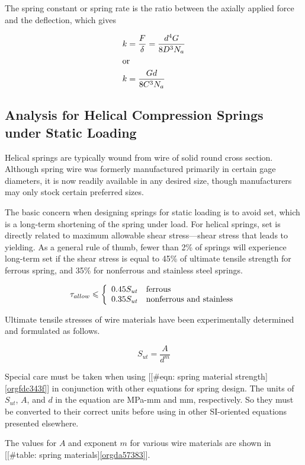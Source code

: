 \documentclass[a4paper,openany,12pt]{book}
\begin{document}
{{The spring constant or spring rate is the ratio between the axially
applied force and the deflection, which gives

\begin{gather}
\label{eq:orgcc2af92}
  k = \frac{F}{\delta} = \frac{d^4G}{8D^3N_a} \hfill \\
  \text{or} \hfill \\
  k = \frac{Gd}{8C^3N_a} \hfill \\ 
\end{gather}

\subsection{Analysis for Helical Compression Springs under Static Loading}
\label{sec:orga96fcd2}
Helical springs are typically wound from wire of solid round cross
section. Although spring wire was formerly manufactured primarily in
certain gage diameters, it is now readily available in any desired size,
though manufacturers may only stock certain preferred sizes.

The basic concern when designing springs for static loading is to avoid
set, which is a long-term shortening of the spring under load. For
helical springs, set is directly related to maximum allowable shear
stress---shear stress that leads to yielding. As a general rule of
thumb, fewer than 2\% of springs will experience long-term set if the
shear stress is equal to 45\% of ultimate tensile strength for ferrous
spring, and 35\% for nonferrous and stainless steel springs.

$$\tau_{allow} \leqslant \left\{
    \begin{array}{ll}
       0.45 S_{ut} & \text{ferrous} \hfill \\ 
       0.35 S_{ut} & \text{nonferrous and stainless} 
     \end{array} \right.$$

Ultimate tensile stresses of wire materials have been experimentally
determined and formulated as follows.

$$S_{ut} = \frac{A}{d^m}$$

Special care must be taken when using
[[\#eqn: spring material strength]\ref{orgfdc343f}] in
conjunction with other equations for spring design. The units of
\(S_{ut}\), \(A\), and \(d\) in the equation are MPa-mm and mm, respectively.
So they must be converted to their correct units before using in other
SI-oriented equations presented elsewhere.

The values for \(A\) and exponent \(m\) for various wire materials are shown
in [[\#table: spring materials]\ref{orgda57383}].


}}
\end{document}
